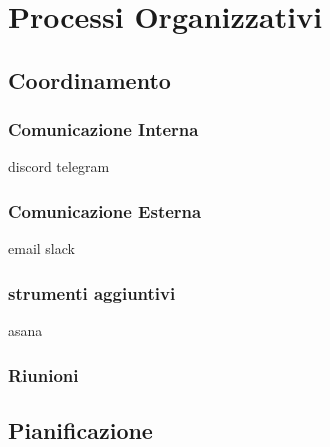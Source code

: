 \section{Processi Organizzativi}
\subsection{Coordinamento}
\subsubsection{Comunicazione Interna}
discord
telegram
\subsubsection{Comunicazione Esterna}
email
slack
\subsubsection{strumenti aggiuntivi}
asana
\subsubsection{Riunioni}
\subsection{Pianificazione}
